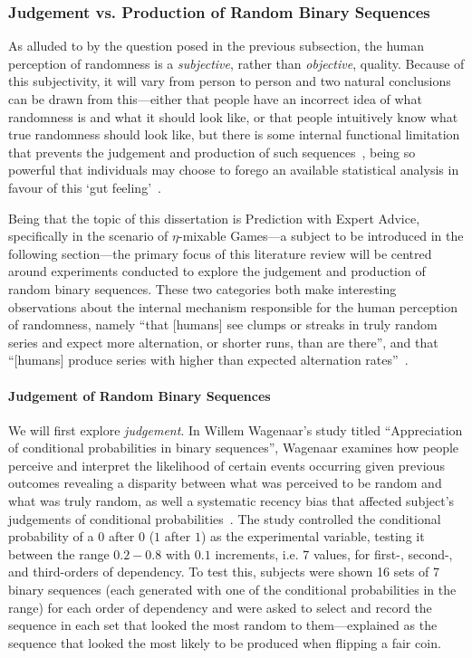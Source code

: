\subsubsection{Judgement vs. Production of Random Binary Sequences}
As alluded to by the question posed in the previous subsection, the human perception of randomness is a \textit{subjective}, rather than \textit{objective}, quality. Because of this subjectivity, it will vary from person to person and two natural conclusions can be drawn from this—either that people have an incorrect idea of what randomness is and what it should look like, or that people intuitively know what true randomness should look like, but there is some internal functional limitation that prevents the judgement and production of such sequences~\cite{wagenaar:1970}, being so powerful that individuals may choose to forego an available statistical analysis in favour of this `gut feeling'~\cite{bar-hillel:1991}.

Being that the topic of this dissertation is Prediction with Expert Advice, specifically in the scenario of $\eta$-mixable Games—a subject to be introduced in the following section—the primary focus of this literature review will be centred around experiments conducted to explore the judgement and production of random binary sequences. These two categories both make interesting observations about the internal mechanism responsible for the human perception of randomness, namely ``that [humans] see clumps or streaks in truly random series and expect more alternation, or shorter runs, than are there'', and that ``[humans] produce series with higher than expected alternation rates''~\cite{bar-hillel:1991}.

\paragraph{Judgement of Random Binary Sequences}
We will first explore \textit{judgement}. In Willem Wagenaar's study titled ``Appreciation of conditional probabilities in binary sequences'', Wagenaar examines how people perceive and interpret the likelihood of certain events occurring given previous outcomes revealing a disparity between what was perceived to be random and what was truly random, as well a systematic recency bias that affected subject's judgements of conditional probabilities~\cite{wagenaar:1970}. The study controlled the conditional probability of a $0$ after $0$ ($1$ after $1$) as the experimental variable, testing it between the range $0.2-0.8$ with $0.1$ increments, i.e. 7 values, for first-, second-, and third-orders of dependency. To test this, subjects were shown 16 sets of 7 binary sequences (each generated with one of the conditional probabilities in the range) for each order of dependency and were asked to select and record the sequence in each set that looked the most random to them—explained as the sequence that looked the most likely to be produced when flipping a fair coin.

